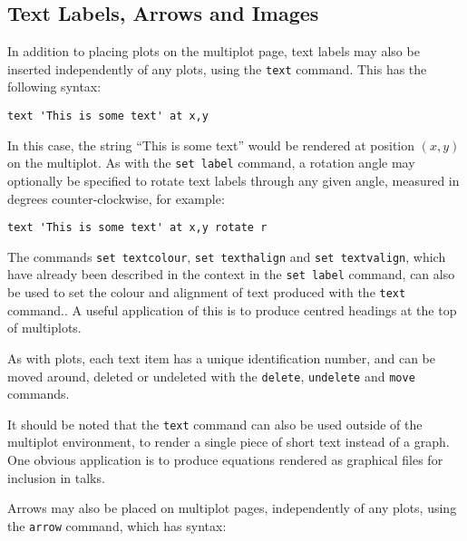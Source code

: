 \subsection{Text Labels, Arrows and Images}

\label{text_command} In addition to
placing plots on the multiplot page, text labels may also be inserted
independently of any plots, using the \texttt{text} command. This has the
following syntax:

\begin{verbatim} 
text 'This is some text' at x,y
\end{verbatim}

In this case, the string ``This is some text'' would be rendered at position
$(x,y)$ on the multiplot. As with the \texttt{set label} command, a rotation
angle may optionally be specified to rotate text labels through any given
angle, measured in degrees counter-clockwise, for example:

\begin{verbatim} 
text 'This is some text' at x,y rotate r
\end{verbatim}

The commands \texttt{set textcolour}, \texttt{set
texthalign} and \texttt{set textvalign}, which have already been described in
the context in the \texttt{set label} command, can also be used to set the
colour and alignment of text produced with the \texttt{text} command.. A useful application of this is to
produce centred headings at the top of multiplots.

As with plots, each text item has a unique identification number, and can be
moved around, deleted or undeleted with the \texttt{delete}, \texttt{undelete}
and \texttt{move} commands.

It should be noted that the \texttt{text} command can also be used outside of
the multiplot environment, to render a single piece of short text instead of a
graph. One obvious application is to produce equations rendered as graphical
files for inclusion in talks.

\label{arrows}  Arrows may also be
placed on multiplot pages, independently of any plots, using the \texttt{arrow}
command, which has syntax:

